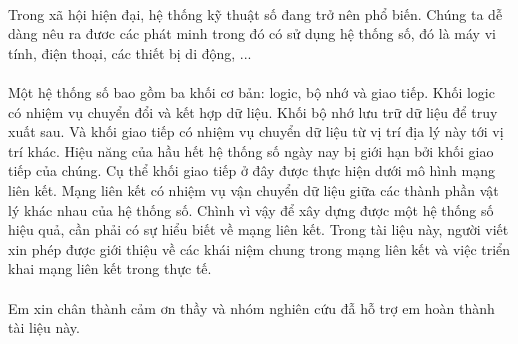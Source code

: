 \documentclass[../report.tex]{subfiles}
\begin{document}
\paragraph*{}Trong xã hội hiện đại, hệ thống kỹ thuật số đang trở nên phổ biến. Chúng ta dễ dàng nêu ra đươc các phát minh trong đó có sử dụng hệ thống số, đó là máy vi tính, điện thoại, các thiết bị di động, ...

\paragraph*{}Một hệ thống số bao gồm ba khối cơ bản: logic, bộ nhớ và giao tiếp. Khối logic có nhiệm vụ chuyển đổi và kết hợp dữ liệu. Khối bộ nhớ lưu trữ dữ liệu để truy xuất sau. Và khối giao tiếp có nhiệm vụ chuyển dữ liệu từ vị trí địa lý này tới vị trí khác.
Hiệu năng của hầu hết hệ thống số ngày nay bị giới hạn bởi khối giao tiếp của chúng. Cụ thể khối giao tiếp ở đây được thực hiện dưới mô hình mạng liên kết. Mạng liên kết có nhiệm vụ vận chuyển dữ liệu giữa các thành phần vật lý khác nhau của hệ thống số. Chình vì vậy để xây dựng được một hệ thống số hiệu quả, cần phải có sự hiểu biết về mạng liên kết. Trong tài liệu này, người viết xin phép được giới thiệu về các khái niệm chung trong mạng liên kết và việc triển khai mạng liên kết trong thực tế.
\paragraph*{}Em xin chân thành cảm ơn thầy và nhóm nghiên cứu đẫ hỗ trợ em hoàn thành tài liệu này.
\end{document}
